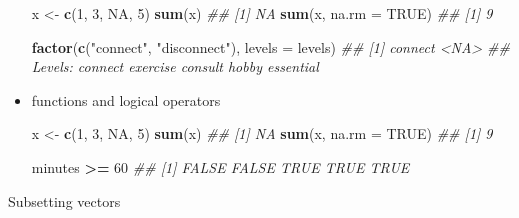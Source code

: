 \documentclass[
]{book}
\newenvironment{Shaded}{\begin{snugshade}}{\end{snugshade}}
\newcommand{\CommentTok}[1]{\textcolor[rgb]{0.56,0.35,0.01}{\textit{#1}}}
\newcommand{\DataTypeTok}[1]{\textcolor[rgb]{0.13,0.29,0.53}{#1}}
\newcommand{\DecValTok}[1]{\textcolor[rgb]{0.00,0.00,0.81}{#1}}
\newcommand{\KeywordTok}[1]{\textcolor[rgb]{0.13,0.29,0.53}{\textbf{#1}}}
\newcommand{\NormalTok}[1]{#1}
\newcommand{\OperatorTok}[1]{\textcolor[rgb]{0.81,0.36,0.00}{\textbf{#1}}}
\newcommand{\OtherTok}[1]{\textcolor[rgb]{0.56,0.35,0.01}{#1}}
\newcommand{\StringTok}[1]{\textcolor[rgb]{0.31,0.60,0.02}{#1}}
\begin{document}
\begin{itemize}
\begin{Shaded}
\begin{Highlighting}[]
\NormalTok{x <-}\StringTok{ }\KeywordTok{c}\NormalTok{(}\DecValTok{1}\NormalTok{, }\DecValTok{3}\NormalTok{, }\OtherTok{NA}\NormalTok{, }\DecValTok{5}\NormalTok{)}
\KeywordTok{sum}\NormalTok{(x)}
\CommentTok{## [1] NA}
\KeywordTok{sum}\NormalTok{(x, }\DataTypeTok{na.rm =} \OtherTok{TRUE}\NormalTok{)}
\CommentTok{## [1] 9}

\KeywordTok{factor}\NormalTok{(}\KeywordTok{c}\NormalTok{(}\StringTok{"connect"}\NormalTok{, }\StringTok{"disconnect"}\NormalTok{), }\DataTypeTok{levels =}\NormalTok{ levels)}
\CommentTok{## [1] connect <NA>   }
\CommentTok{## Levels: connect exercise consult hobby essential}
\end{Highlighting}
\end{Shaded}
\item
  functions and logical operators

\begin{Shaded}
\begin{Highlighting}[]
\NormalTok{x <-}\StringTok{ }\KeywordTok{c}\NormalTok{(}\DecValTok{1}\NormalTok{, }\DecValTok{3}\NormalTok{, }\OtherTok{NA}\NormalTok{, }\DecValTok{5}\NormalTok{)}
\KeywordTok{sum}\NormalTok{(x)}
\CommentTok{## [1] NA}
\KeywordTok{sum}\NormalTok{(x, }\DataTypeTok{na.rm =} \OtherTok{TRUE}\NormalTok{)}
\CommentTok{## [1] 9}

\NormalTok{minutes }\OperatorTok{>=}\StringTok{ }\DecValTok{60}
\CommentTok{## [1] FALSE FALSE  TRUE  TRUE  TRUE}
\end{Highlighting}
\end{Shaded}
\end{itemize}

Subsetting vectors
\end{document}

